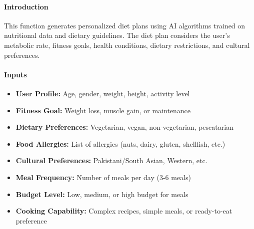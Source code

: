 \documentclass[12pt,a4paper]{article}
\begin{document}
\paragraph{Introduction}
This function generates personalized diet plans using AI algorithms trained on nutritional data and dietary guidelines. The diet plan considers the user's metabolic rate, fitness goals, health conditions, dietary restrictions, and cultural preferences.

\paragraph{Inputs}
\begin{itemize}
    \item \textbf{User Profile:} Age, gender, weight, height, activity level
    \item \textbf{Fitness Goal:} Weight loss, muscle gain, or maintenance
    \item \textbf{Dietary Preferences:} Vegetarian, vegan, non-vegetarian, pescatarian
    \item \textbf{Food Allergies:} List of allergies (nuts, dairy, gluten, shellfish, etc.)
    \item \textbf{Cultural Preferences:} Pakistani/South Asian, Western, etc.
    \item \textbf{Meal Frequency:} Number of meals per day (3-6 meals)
    \item \textbf{Budget Level:} Low, medium, or high budget for meals
    \item \textbf{Cooking Capability:} Complex recipes, simple meals, or ready-to-eat preference
\end{itemize}
\end{document}
